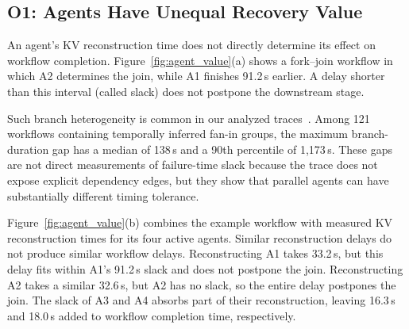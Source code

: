 

\subsection{O1: Agents Have Unequal Recovery Value} \label{sec:motivation:agent} 


An agent's KV reconstruction time does not directly determine its effect on workflow completion. Figure~\ref{fig:agent_value}(a) shows a fork--join workflow in which A2 determines the join, while A1 finishes 91.2\,s earlier. A delay shorter than this interval (called slack) does not postpone the downstream stage. 

Such branch heterogeneity is common in our analyzed traces~\cite{semianalysis2026cctraces}. Among 121 workflows containing temporally inferred fan-in groups, the maximum branch-duration gap has a median of 138\,s and a 90th percentile of 1,173\,s. These gaps are not direct measurements of failure-time slack because the trace does not expose explicit dependency edges, but they show that parallel agents can have substantially different timing tolerance. 

Figure~\ref{fig:agent_value}(b) combines the example workflow with measured KV reconstruction times for its four active agents. Similar reconstruction delays do not produce similar workflow delays. Reconstructing A1 takes 33.2\,s, but this delay fits within A1's 91.2\,s slack and does not postpone the join. Reconstructing A2 takes a similar 32.6\,s, but A2 has no slack, so the entire delay postpones the join. The slack of A3 and A4 absorbs part of their reconstruction, leaving 16.3\,s and 18.0\,s added to workflow completion time, respectively.

